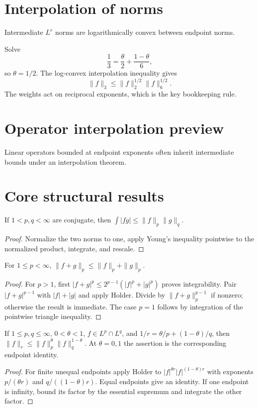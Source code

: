 \section{Interpolation of norms}
Intermediate $L^r$ norms are logarithmically convex between endpoint norms.


\begin{example}\label{ex:iii07-expand-03}
Solve
\[
\frac13=\frac{\theta}{2}+\frac{1-\theta}{6},
\]
so \(\theta=1/2\). The log-convex interpolation inequality gives
\[
\|f\|_3\le\|f\|_2^{1/2}\|f\|_6^{1/2}.
\]
The weights act on reciprocal exponents, which is the key bookkeeping rule.
\end{example}
\section{Operator interpolation preview}
Linear operators bounded at endpoint exponents often inherit intermediate bounds under an interpolation theorem.

\section{Core structural results}

\begin{theorem}\label{thm:iii07-01}
If $1<p,q<\infty$ are conjugate, then $\int|fg|\le\|f\|_p\|g\|_q$.
\begin{proof}
Normalize the two norms to one, apply Young's inequality pointwise to the normalized product, integrate, and rescale.
\end{proof}
\end{theorem}

\begin{theorem}\label{thm:iii07-02}
For $1\le p<\infty$, $\|f+g\|_p\le\|f\|_p+\|g\|_p$.
\begin{proof}
For $p>1$, first $|f+g|^p\le2^{p-1}(|f|^p+|g|^p)$ proves integrability. Pair $|f+g|^{p-1}$ with $|f|+|g|$ and apply Holder. Divide by $\|f+g\|_p^{p-1}$ if nonzero; otherwise the result is immediate. The case $p=1$ follows by integration of the pointwise triangle inequality.
\end{proof}
\end{theorem}

\begin{theorem}\label{thm:iii07-03}
If $1\le p,q\le\infty$, $0<\theta<1$, $f\in L^p\cap L^q$, and $1/r=\theta/p+(1-\theta)/q$, then $\|f\|_r\le\|f\|_p^\theta\|f\|_q^{1-\theta}$. At $\theta=0,1$ the assertion is the corresponding endpoint identity.
\begin{proof}
For finite unequal endpoints apply Holder to $|f|^{\theta r}|f|^{(1-\theta)r}$ with exponents $p/(\theta r)$ and $q/((1-\theta)r)$. Equal endpoints give an identity. If one endpoint is infinity, bound its factor by the essential supremum and integrate the other factor.
\end{proof}
\end{theorem}

